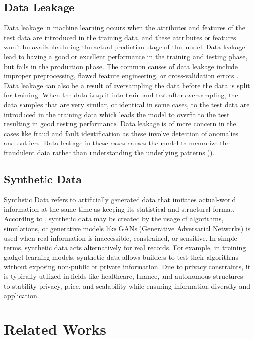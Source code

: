 \documentclass[twoside,11pt]{article}
\begin{document}
\subsection{Data Leakage}
Data leakage in machine learning occurs when the attributes and features of the test data are introduced in the training data, and these attributes or features won't be available during the actual prediction stage of the model. Data leakage lead to having a good or excellent performance in the training and testing phase, but fails in the production phase. The common causes of data leakage include improper preprocessing, flawed feature engineering, or cross-validation errors \cite{Kaufman2012}. Data leakage can also be a result of oversampling the data before the data is split for training. When the data is split into train and test after oversampling, the data samples that are very similar, or identical in some cases, to the test data are introduced in the training data which leads the model to overfit to the test resulting in good testing performance. Data leakage is of more concern in the cases like fraud and fault identification as these involve detection of anomalies and outliers. Data leakage in these cases causes the model to memorize the fraudulent data rather than understanding the underlying patterns (\citealp{baesensRobROSERobustApproach2021}).

\subsection{Synthetic Data}
Synthetic Data refers to artificially generated data that imitates actual-world information at the same time as keeping its statistical and structural format. According to \citealp{SyntheticPatki2016}, synthetic data may be created by the usage of algorithms, simulations, or generative models like GANs (Generative Adversarial Networks) is used when real information is inaccessible, constrained, or sensitive.
In simple terms, synthetic data acts alternatively for real records. For example, in training gadget learning models, synthetic data allows builders to test their algorithms without exposing non-public or private information. Due to privacy constraints, it is typically utilized in fields like healthcare, finance, and autonomous structures to stability privacy, price, and scalability while ensuring information diversity and application.

\section{Related Works}\label{sec:relatedwork}
\end{document}
